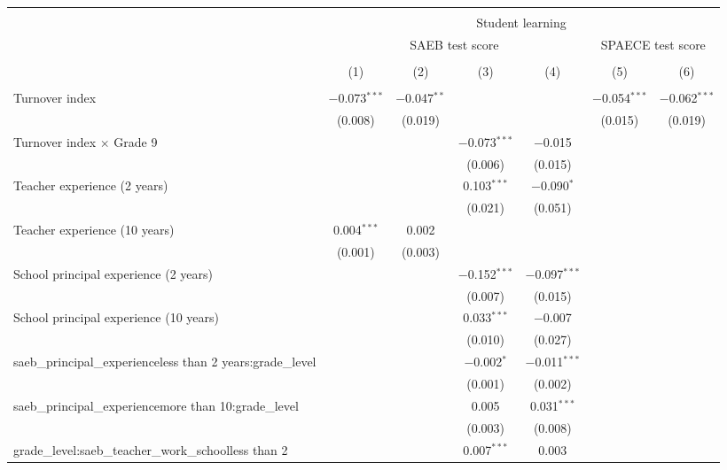 
\begingroup 
\small 
\begin{tabular}{@{\extracolsep{5pt}}lcccccc} 
\\[-1.8ex]\hline 
\hline \\[-1.8ex] 
 & \multicolumn{6}{c}{Student learning} \\ 
\cline{2-7} 
 & \multicolumn{4}{c}{SAEB test score} & \multicolumn{2}{c}{SPAECE test score} \\ 
\\[-1.8ex] & (1) & (2) & (3) & (4) & (5) & (6)\\ 
\hline \\[-1.8ex] 
 Turnover index & $-$0.073$^{***}$ & $-$0.047$^{**}$ &  &  & $-$0.054$^{***}$ & $-$0.062$^{***}$ \\ 
  & (0.008) & (0.019) &  &  & (0.015) & (0.019) \\ 
  Turnover index $\times$ Grade 9 &  &  & $-$0.073$^{***}$ & $-$0.015 &  &  \\ 
  &  &  & (0.006) & (0.015) &  &  \\ 
  Teacher experience (2 years) &  &  & 0.103$^{***}$ & $-$0.090$^{*}$ &  &  \\ 
  &  &  & (0.021) & (0.051) &  &  \\ 
  Teacher experience (10 years) & 0.004$^{***}$ & 0.002 &  &  &  &  \\ 
  & (0.001) & (0.003) &  &  &  &  \\ 
  School principal experience (2 years) &  &  & $-$0.152$^{***}$ & $-$0.097$^{***}$ &  &  \\ 
  &  &  & (0.007) & (0.015) &  &  \\ 
  School principal experience (10 years) &  &  & 0.033$^{***}$ & $-$0.007 &  &  \\ 
  &  &  & (0.010) & (0.027) &  &  \\ 
  saeb\_principal\_experienceless than 2 years:grade\_level &  &  & $-$0.002$^{*}$ & $-$0.011$^{***}$ &  &  \\ 
  &  &  & (0.001) & (0.002) &  &  \\ 
  saeb\_principal\_experiencemore than 10:grade\_level &  &  & 0.005 & 0.031$^{***}$ &  &  \\ 
  &  &  & (0.003) & (0.008) &  &  \\ 
  grade\_level:saeb\_teacher\_work\_schoolless than 2 &  &  & 0.007$^{***}$ & 0.003 &  &  \\ 

\end{tabular}
